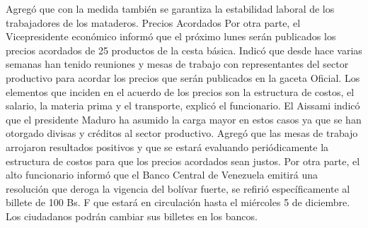 \documentclass{article}%
\begin{document}
\newline%
%
Agregó que con la medida también se garantiza la estabilidad laboral de los trabajadores de los mataderos.%
\newline%
%
Precios Acordados%
\newline%
%
Por otra parte, el Vicepresidente económico informó que el próximo lunes serán publicados los precios acordados de 25 productos  de la cesta básica.%
\newline%
%
Indicó que desde hace varias semanas han tenido reuniones y mesas de trabajo con representantes  del sector productivo para acordar los precios que serán publicados en la gaceta Oficial.%
\newline%
%
Los elementos que inciden en el acuerdo de los precios  son la estructura de costos, el salario, la materia prima y el transporte, explicó el funcionario.%
\newline%
%
El Aissami indicó que el presidente Maduro ha asumido la carga mayor en estos casos ya que se han otorgado divisas y créditos al sector productivo.%
\newline%
%
Agregó que las mesas de trabajo arrojaron resultados positivos y que se estará evaluando periódicamente  la estructura de costos para que los precios acordados sean justos.%
\newline%
%
Por otra parte, el alto funcionario informó que el Banco Central de Venezuela emitirá una resolución  que deroga la vigencia del bolívar fuerte, se refirió específicamente al billete de 100 Bs. F que estará en circulación hasta el miércoles 5 de diciembre.%
\newline%
%
Los ciudadanos podrán cambiar sus billetes en los bancos.%
\newline%
%
\end{document}
